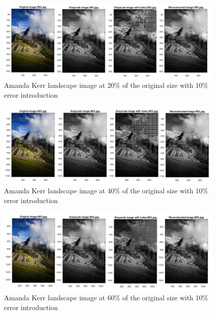 

\begin{figure}[!ht]
\center \includegraphics[scale=0.31]{AmandaKerr20.jpg}
\caption{Amanda Kerr landscape image at 20\% of the original size with 10\% error introduction}
\label{fig:AmandaKerr20}
\end{figure}

\begin{figure}[!ht]
\center \includegraphics[scale=0.31]{AmandaKerr40.jpg}
\caption{Amanda Kerr landscape image at 40\% of the original size with 10\% error introduction}
\label{fig:AmandaKerr40}
\end{figure}

\begin{figure}[!ht]
\center \includegraphics[scale=0.31]{AmandaKerr60.jpg}
\caption{Amanda Kerr landscape image at 60\% of the original size with 10\% error introduction}
\label{fig:AmandaKerr60}
\end{figure}


